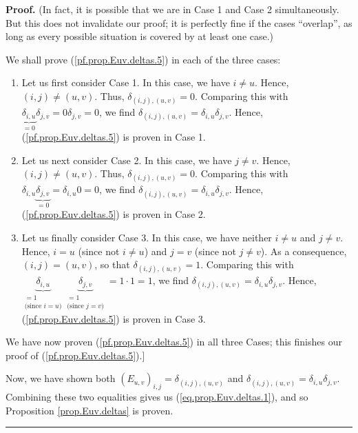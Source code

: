 \documentclass[numbers=enddot,12pt,final,onecolumn,notitlepage]{scrartcl}%
\theoremstyle{definition}
\newenvironment{proof}[1][Proof]{\noindent\textbf{#1.} }{\ \rule{0.5em}{0.5em}}
\begin{document}
\begin{proof}
(In fact, it is possible that we are in Case 1 and Case 2 simultaneously. But
this does not invalidate our proof; it is perfectly fine if the cases
\textquotedblleft overlap\textquotedblright, as long as every possible
situation is covered by at least one case.)

We shall prove (\ref{pf.prop.Euv.deltas.5}) in each of the three cases:

\begin{enumerate}
\item Let us first consider Case 1. In this case, we have $i\neq u$. Hence,
$\left(  i,j\right)  \neq\left(  u,v\right)  $. Thus, $\delta_{\left(
i,j\right)  ,\left(  u,v\right)  }=0$. Comparing this with $\underbrace{\delta
_{i,u}}_{=0}\delta_{j,v}=0\delta_{j,v}=0$, we find $\delta_{\left(
i,j\right)  ,\left(  u,v\right)  }=\delta_{i,u}\delta_{j,v}$. Hence,
(\ref{pf.prop.Euv.deltas.5}) is proven in Case 1.

\item Let us next consider Case 2. In this case, we have $j\neq v$. Hence,
$\left(  i,j\right)  \neq\left(  u,v\right)  $. Thus, $\delta_{\left(
i,j\right)  ,\left(  u,v\right)  }=0$. Comparing this with $\delta
_{i,u}\underbrace{\delta_{j,v}}_{=0}=\delta_{i,u}0=0$, we find $\delta
_{\left(  i,j\right)  ,\left(  u,v\right)  }=\delta_{i,u}\delta_{j,v}$. Hence,
(\ref{pf.prop.Euv.deltas.5}) is proven in Case 2.

\item Let us finally consider Case 3. In this case, we have neither $i\neq u$
and $j\neq v$. Hence, $i=u$ (since not $i\neq u$) and $j=v$ (since not $j\neq
v$). As a consequence, $\left(  i,j\right)  =\left(  u,v\right)  $, so that
$\delta_{\left(  i,j\right)  ,\left(  u,v\right)  }=1$. Comparing this with
$\underbrace{\delta_{i,u}}_{\substack{=1\\\text{(since }i=u\text{)}%
}}\underbrace{\delta_{j,v}}_{\substack{=1\\\text{(since }j=v\text{)}}%
}=1\cdot1=1$, we find $\delta_{\left(  i,j\right)  ,\left(  u,v\right)
}=\delta_{i,u}\delta_{j,v}$. Hence, (\ref{pf.prop.Euv.deltas.5}) is proven in
Case 3.
\end{enumerate}

We have now proven (\ref{pf.prop.Euv.deltas.5}) in all three Cases; this
finishes our proof of (\ref{pf.prop.Euv.deltas.5}).]

Now, we have shown both $\left(  E_{u,v}\right)  _{i,j}=\delta_{\left(
i,j\right)  ,\left(  u,v\right)  }$ and $\delta_{\left(  i,j\right)  ,\left(
u,v\right)  }=\delta_{i,u}\delta_{j,v}$. Combining these two equalities gives
us (\ref{eq.prop.Euv.deltas.1}), and so Proposition \ref{prop.Euv.deltas} is proven.
\end{proof}
\end{document}
